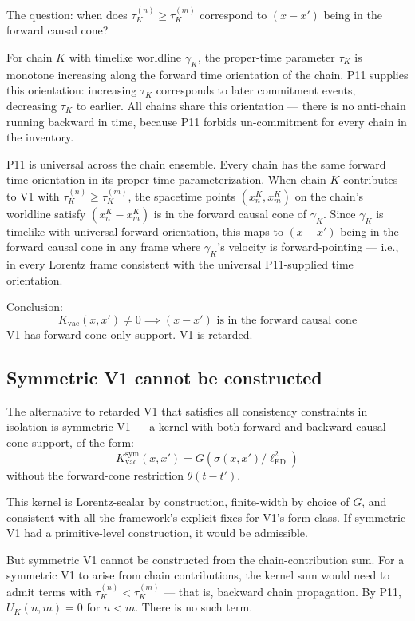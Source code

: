 \documentclass[11pt,a4paper]{article}
\begin{document}
The question: when does $\tau_K^{(n)} \geq \tau_K^{(m)}$ correspond to $(x - x')$ being in the forward causal cone?

For chain $K$ with timelike worldline $\gamma_K$, the proper-time parameter $\tau_K$ is monotone increasing along the forward time orientation of the chain. P11 supplies this orientation: increasing $\tau_K$ corresponds to later commitment events, decreasing $\tau_K$ to earlier. All chains share this orientation --- there is no anti-chain running backward in time, because P11 forbids un-commitment for every chain in the inventory.

P11 is universal across the chain ensemble. Every chain has the same forward time orientation in its proper-time parameterization. When chain $K$ contributes to V1 with $\tau_K^{(n)} \geq \tau_K^{(m)}$, the spacetime points $(x_n^K, x_m^K)$ on the chain's worldline satisfy $(x_n^K - x_m^K)$ is in the forward causal cone of $\gamma_K$. Since $\gamma_K$ is timelike with universal forward orientation, this maps to $(x - x')$ being in the forward causal cone in any frame where $\gamma_K$'s velocity is forward-pointing --- i.e., in every Lorentz frame consistent with the universal P11-supplied time orientation.

Conclusion:
\[
K_{\mathrm{vac}}(x, x') \neq 0 \implies (x - x') \text{ is in the forward causal cone}
\]
V1 has forward-cone-only support. V1 is retarded.

\subsection{Symmetric V1 cannot be constructed}

The alternative to retarded V1 that satisfies all consistency constraints in isolation is symmetric V1 --- a kernel with both forward and backward causal-cone support, of the form:
\[
K_{\mathrm{vac}}^{\mathrm{sym}}(x, x') = G\!\left(\sigma(x, x') / \ell_{\mathrm{ED}}^{2}\right)
\]
without the forward-cone restriction $\theta(t - t')$.

This kernel is Lorentz-scalar by construction, finite-width by choice of $G$, and consistent with all the framework's explicit fixes for V1's form-class. If symmetric V1 had a primitive-level construction, it would be admissible.

But symmetric V1 cannot be constructed from the chain-contribution sum. For a symmetric V1 to arise from chain contributions, the kernel sum would need to admit terms with $\tau_K^{(n)} < \tau_K^{(m)}$ --- that is, backward chain propagation. By P11, $U_K(n, m) = 0$ for $n < m$. There is no such term.
\end{document}
